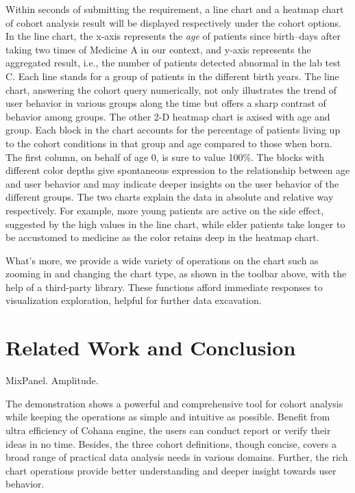 \documentclass[10pt,conference,letterpaper]{IEEEtran}
\begin{document}
Within seconds of submitting the requirement, a line chart and a heatmap chart of cohort analysis result will be displayed respectively under the cohort options. In the line chart, the x-axis represents the \emph{age} of patients since birth--days after taking two times of Medicine A in our context, and y-axis represents the aggregated result, i.e., the number of patients detected abnormal in the lab test C. Each line stands for a group of patients in the different birth years. The line chart, answering the cohort query numerically, not only illustrates the trend of user behavior in various groups along the time but offers a sharp contrast of behavior among groups. The other 2-D heatmap chart is axised with age and group. Each block in the chart accounts for the percentage of patients living up to the cohort conditions in that group and age compared to those when born. The first column, on behalf of age 0, is sure to value 100\%. The blocks with different color depths give spontaneous expression to the relationship between age and user behavior and may indicate deeper insights on the user behavior of the different groups. The two charts explain the data in absolute and relative way respectively. For example, more young patients are active on the side effect, suggested by the high values in the line chart, while elder patients take longer to be accustomed to medicine as the color retains deep in the heatmap chart.

What's more, we provide a wide variety of operations on the chart such as zooming in and changing the chart type, as shown in the toolbar above, with the help of a third-party library. These functions afford immediate responses to visualization exploration, helpful for further data excavation.

\section{Related Work and Conclusion}

MixPanel. Amplitude. 

The demonstration shows a powerful and comprehensive tool for cohort analysis while keeping the operations as simple and intuitive as possible. Benefit from ultra efficiency of Cohana engine, the users can conduct report or verify their ideas in no time. Besides, the three cohort definitions, though concise, covers a broad range of practical data analysis needs in various domains. Further, the rich chart operations provide better understanding and deeper insight towards user behavior.







\end{document}
